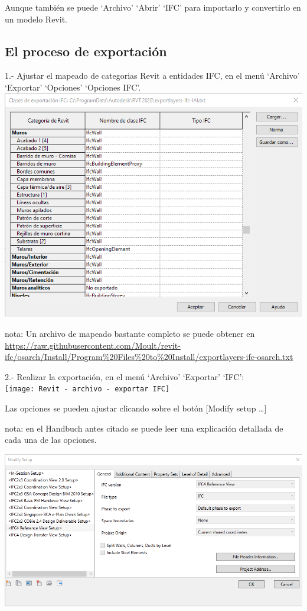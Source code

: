 \documentclass[spanish,12pt,a4paper,final,oneside]{book}
\begin{document}
Aunque también se puede `Archivo' `Abrir' `IFC' para importarlo y convertirlo en un modelo Revit.


\subsection{El proceso de exportación}
1.- Ajustar el mapeado de categorias Revit a entidades IFC, en el menú `Archivo' `Exportar' `Opciones' `Opciones IFC'. 
\\ \includegraphics[width=.7\textwidth]{Revit - archivo - exportar - opciones - opciones IFC}
\\ \begin{footnotesize} nota: Un archivo de mapeado bastante completo se puede obtener en \url{https://raw.githubusercontent.com/Moult/revit-ifc/osarch/Install/Program%20Files%20to%20Install/exportlayers-ifc-osarch.txt} \end{footnotesize}

2.- Realizar la exportación, en el menú `Archivo' `Exportar' `IFC':
\\ \texttt{[image: Revit - archivo -  exportar IFC]}

Las opciones se pueden ajustar clicando sobre el botón [Modify setup \ldots]

\begin{footnotesize}nota: en el Handbuch antes citado se puede leer una explicación detallada de cada una de las opciones.\end{footnotesize}

\includegraphics[width=.9\textwidth]{Revit - exportar IFC - modify setup - 1 - general}
\end{document}
